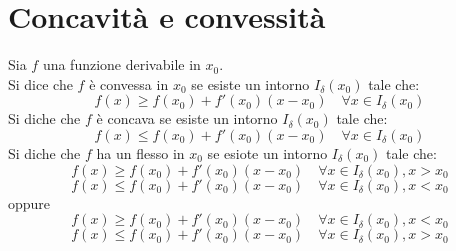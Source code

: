 \documentclass[12pt, a4paper]{report}
\begin{document}
    \section{Concavità e convessità}
    Sia $f$ una funzione derivabile in $x_{0}$.\\
    Si dice che $f$ è convessa in $x_{0}$ se esiste un intorno $I_{\delta}(x_{0})$ tale che:
    \begin{equation*}
        f(x)\geq f(x_{0})+f'(x_{0})(x-x_{0}) \quad \forall x \in I_{\delta}(x_{0})
    \end{equation*}
    Si diche che $f$ è concava se esiste un intorno $I_{\delta}(x_{0})$ tale che:
    \begin{equation*}
        f(x)\leq f(x_{0})+f'(x_{0})(x-x_{0}) \quad \forall x \in I_{\delta}(x_{0})
    \end{equation*}
    Si diche che $f$ ha un flesso in $x_{0}$ se esiote un intorno $I_{\delta}(x_{0})$ tale che:
    \begin{equation*}
        f(x)\geq f(x_{0})+f'(x_{0})(x-x_{0}) \quad \forall x \in I_{\delta}(x_{0}), x > x_{0}
    \end{equation*}
    \begin{equation*}
        f(x)\leq f(x_{0})+f'(x_{0})(x-x_{0}) \quad \forall x \in I_{\delta}(x_{0}), x < x_{0}
    \end{equation*}
    oppure
    \begin{equation*}
        f(x)\geq f(x_{0})+f'(x_{0})(x-x_{0}) \quad \forall x \in I_{\delta}(x_{0}), x < x_{0}
    \end{equation*}
    \begin{equation*}
        f(x)\leq f(x_{0})+f'(x_{0})(x-x_{0}) \quad \forall x \in I_{\delta}(x_{0}), x > x_{0}
    \end{equation*}
\end{document}
